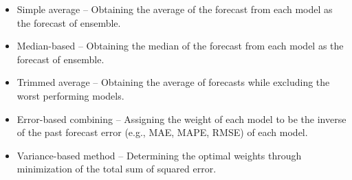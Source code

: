\begin{itemize}
\item Simple average -- Obtaining the average of the forecast from each model as the forecast of ensemble.
\item Median-based -- Obtaining the median of the forecast from each model as the forecast of ensemble.
\item Trimmed average -- Obtaining the average of forecasts while excluding the worst performing models.
\item Error-based combining -- Assigning the weight of each model to be the inverse of the past forecast error (e.g., MAE, MAPE, RMSE) of each model.
\item Variance-based method -- Determining the optimal weights through minimization of the total sum of squared error.
\end{itemize}
